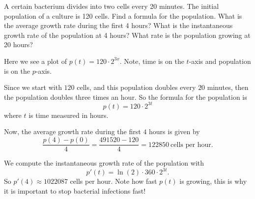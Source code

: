 \begin{example}
A certain bacterium divides into two cells every 20 minutes. The
initial population of a culture is 120 cells. Find a formula for the
population.  What is the average growth rate during the first 4 hours?
What is the instantaneous growth rate of the population at 4 hours?
What rate is the population growing at 20 hours?
\end{example}
\begin{marginfigure}
\caption{Here we see a plot of $p(t) = 120\cdot 2^{3x}$. Note, time is on
  the $t$-axis and population is on the $p$-axis.}
\end{marginfigure}


\begin{solution}
Since we start with $120$ cells, and this population doubles every $20$
minutes, then the population doubles three times an hour. So the
formula for the population is
\[
p(t) = 120\cdot 2^{3t}
\]
where $t$ is time measured in hours.

Now, the average growth rate during the first $4$ hours is given by
\[
\frac{p(4)-p(0)}{4} =\frac{491520-120}{4} = 122850~\text{cells per hour.}
\]

We compute the instantaneous growth rate of the population with
\[
p'(t) = \ln(2)\cdot 360\cdot 2^{3t}.
\]
So $p'(4) \approx 1022087$ cells per hour. Note how fast $p(t)$ is
growing, this is why it is important to stop bacterial infections
fast!
\end{solution}




